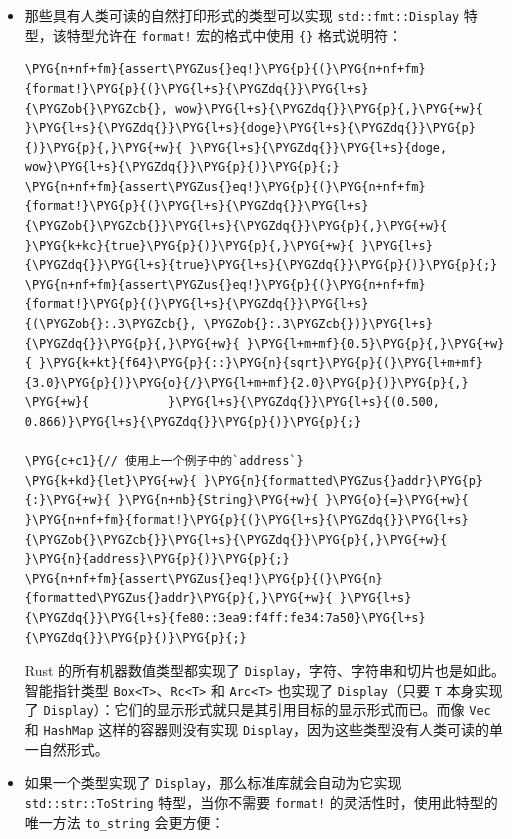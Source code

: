 \begin{itemize}
\item 那些具有人类可读的自然打印形式的类型可以实现 \texttt{std::fmt::Display} 特型，该特型允许在 \texttt{format!} 宏的格式中使用 \texttt{\{\}} 格式说明符：

\begin{Verbatim}[commandchars=\\\{\},breaklines=true,breakanywhere=true,fontsize=\codefont,xleftmargin=17bp]
\PYG{n+nf+fm}{assert\PYGZus{}eq!}\PYG{p}{(}\PYG{n+nf+fm}{format!}\PYG{p}{(}\PYG{l+s}{\PYGZdq{}}\PYG{l+s}{\PYGZob{}\PYGZcb{}, wow}\PYG{l+s}{\PYGZdq{}}\PYG{p}{,}\PYG{+w}{ }\PYG{l+s}{\PYGZdq{}}\PYG{l+s}{doge}\PYG{l+s}{\PYGZdq{}}\PYG{p}{)}\PYG{p}{,}\PYG{+w}{ }\PYG{l+s}{\PYGZdq{}}\PYG{l+s}{doge, wow}\PYG{l+s}{\PYGZdq{}}\PYG{p}{)}\PYG{p}{;}
\PYG{n+nf+fm}{assert\PYGZus{}eq!}\PYG{p}{(}\PYG{n+nf+fm}{format!}\PYG{p}{(}\PYG{l+s}{\PYGZdq{}}\PYG{l+s}{\PYGZob{}\PYGZcb{}}\PYG{l+s}{\PYGZdq{}}\PYG{p}{,}\PYG{+w}{ }\PYG{k+kc}{true}\PYG{p}{)}\PYG{p}{,}\PYG{+w}{ }\PYG{l+s}{\PYGZdq{}}\PYG{l+s}{true}\PYG{l+s}{\PYGZdq{}}\PYG{p}{)}\PYG{p}{;}
\PYG{n+nf+fm}{assert\PYGZus{}eq!}\PYG{p}{(}\PYG{n+nf+fm}{format!}\PYG{p}{(}\PYG{l+s}{\PYGZdq{}}\PYG{l+s}{(\PYGZob{}:.3\PYGZcb{}, \PYGZob{}:.3\PYGZcb{})}\PYG{l+s}{\PYGZdq{}}\PYG{p}{,}\PYG{+w}{ }\PYG{l+m+mf}{0.5}\PYG{p}{,}\PYG{+w}{ }\PYG{k+kt}{f64}\PYG{p}{::}\PYG{n}{sqrt}\PYG{p}{(}\PYG{l+m+mf}{3.0}\PYG{p}{)}\PYG{o}{/}\PYG{l+m+mf}{2.0}\PYG{p}{)}\PYG{p}{,}
\PYG{+w}{           }\PYG{l+s}{\PYGZdq{}}\PYG{l+s}{(0.500, 0.866)}\PYG{l+s}{\PYGZdq{}}\PYG{p}{)}\PYG{p}{;}

\PYG{c+c1}{// 使用上一个例子中的`address`}
\PYG{k+kd}{let}\PYG{+w}{ }\PYG{n}{formatted\PYGZus{}addr}\PYG{p}{:}\PYG{+w}{ }\PYG{n+nb}{String}\PYG{+w}{ }\PYG{o}{=}\PYG{+w}{ }\PYG{n+nf+fm}{format!}\PYG{p}{(}\PYG{l+s}{\PYGZdq{}}\PYG{l+s}{\PYGZob{}\PYGZcb{}}\PYG{l+s}{\PYGZdq{}}\PYG{p}{,}\PYG{+w}{ }\PYG{n}{address}\PYG{p}{)}\PYG{p}{;}
\PYG{n+nf+fm}{assert\PYGZus{}eq!}\PYG{p}{(}\PYG{n}{formatted\PYGZus{}addr}\PYG{p}{,}\PYG{+w}{ }\PYG{l+s}{\PYGZdq{}}\PYG{l+s}{fe80::3ea9:f4ff:fe34:7a50}\PYG{l+s}{\PYGZdq{}}\PYG{p}{)}\PYG{p}{;}
\end{Verbatim}

Rust 的所有机器数值类型都实现了 \texttt{Display}，字符、字符串和切片也是如此。智能指针类型 \texttt{Box<T>}、\texttt{Rc<T>} 和 \texttt{Arc<T>} 也实现了 \texttt{Display}（只要 \texttt{T} 本身实现了 \texttt{Display}）：它们的显示形式就只是其引用目标的显示形式而已。而像 \texttt{Vec} 和 \texttt{HashMap} 这样的容器则没有实现 \texttt{Display}，因为这些类型没有人类可读的单一自然形式。
\item 如果一个类型实现了 \texttt{Display}，那么标准库就会自动为它实现 \texttt{std::str::ToString} 特型，当你不需要 \texttt{format!} 的灵活性时，使用此特型的唯一方法 \texttt{to\_string} 会更方便：


\end{itemize}
